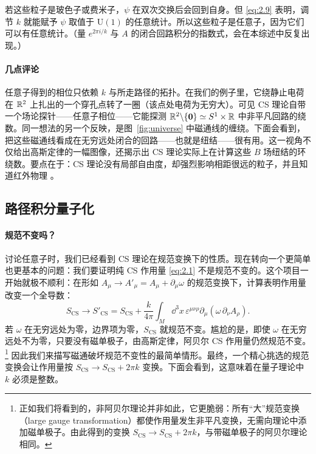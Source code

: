 若这些粒子是玻色子或费米子，$\psi$ 在双次交换后会回到自身。但 \eqref{eq:2.9} 表明，调节 $k$ 就能赋予 $\psi$ 取值于 $\mathrm{U}(1)$ 的任意统计。所以这些粒子是任意子，因为它们可以有任意统计。（量 $e^{2\pi i/k}$ 与 $A$ 的闭合回路积分的指数式，会在本综述中反复出现。）

\paragraph{几点评论} %
任意子得到的相位只依赖 $k$ 与所走路径的拓扑。在我们的例子里，它绕静止电荷在 $\mathbb{R}^2$ 上扎出的一个穿孔点转了一圈（该点处电荷为无穷大）。可见 CS 理论自带一个场论探针——任意子相位——它能探测 $\mathbb{R}^2\backslash\{\mathbf{0}\}\simeq S^1\times\mathbb{R}$ 中非平凡回路的绕数。同一想法的另一个反映，是图~\ref{fig:universe} 中磁通线的缠绕。下面会看到，把这些磁通线看成在无穷远处闭合的回路——也就是纽结——很有用。这一视角不仅给出高斯定律的一幅图像，还揭示出 CS 理论实际上在计算这些 $B$ 场纽结的环绕数。要点在于：CS 理论没有局部自由度，却强烈影响相距很远的粒子，并且知道红外物理 \cite{tong_gauge}。

\subsection{路径积分量子化}\label{sec:2.2}

\paragraph{规范不变吗？} %
讨论任意子时，我们已经看到 CS 理论在规范变换下的性质。现在转向一个更简单也更基本的问题：我们要证明纯 CS 作用量 \eqref{eq:2.1} 不是规范不变的。这个项目一开始就极不顺利：在形如 $A_\mu\to A'_\mu=A_\mu+\partial_\mu\omega$ 的规范变换下，计算表明作用量改变一个全导数：
\begin{equation}\tag{2.10}\label{eq:2.10}
  S_{\mathrm{CS}} \longrightarrow S'_{\mathrm{CS}} = S_{\mathrm{CS}}
  + \frac{k}{4\pi}\int_M \dd^3x\,\varepsilon^{\mu\nu\rho}\partial_\mu(\omega\,\partial_\nu A_\rho) .
\end{equation}
若 $\omega$ 在无穷远处为零，边界项为零，$S_{\mathrm{CS}}$ 就规范不变。尴尬的是，即使 $\omega$ 在无穷远处不为零，只要没有磁单极子，由高斯定律，阿贝尔 CS 作用量仍然规范不变。\footnote{正如我们将看到的，非阿贝尔理论并非如此，它更脆弱：所有“大”规范变换（large gauge transformation）都使作用量发生非平凡变换，无需向理论中添加磁单极子。由此得到的变换 $S_{\mathrm{CS}}\to S_{\mathrm{CS}}+2\pi k$，与带磁单极子的阿贝尔理论相同。} 因此我们来描写磁通破坏规范不变性的最简单情形。最终，一个精心挑选的规范变换会让作用量按 $S_{\mathrm{CS}}\to S_{\mathrm{CS}}+2\pi k$ 变换。下面会看到，这意味着在量子理论中 $k$ 必须是整数。

